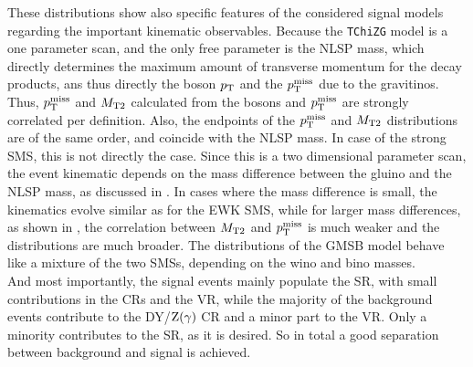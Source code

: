 These distributions show also specific features of the considered signal models regarding the important kinematic observables. Because the \texttt{TChiZG} model is a one parameter scan, and the only free parameter is the NLSP mass, which directly determines the maximum amount of transverse momentum for the decay products, ans thus directly the boson $p_{\mathrm{T}}$ and the $p_{\mathrm{T}}^\text{miss}$ due to the gravitinos. Thus, $p_{\mathrm{T}}^\text{miss}$ and $M_{\mathrm{T2}}$ calculated from the bosons and $p_{\mathrm{T}}^\text{miss}$ are strongly correlated per definition. Also, the endpoints of the $p_{\mathrm{T}}^\text{miss}$ and $M_{\mathrm{T2}}$ distributions are of the same order, and coincide with the NLSP mass. In case of the strong SMS, this is not directly the case. Since this is a two dimensional parameter scan, the event kinematic depends on the mass difference between the gluino and the NLSP mass, as discussed in . In cases where the mass difference is small, the kinematics evolve similar as for the EWK SMS, while for larger mass differences, as shown in , the correlation between $M_{\mathrm{T2}}$ and $p_{\mathrm{T}}^\text{miss}$ is much weaker and the distributions are much broader. The distributions of the GMSB model behave like a mixture of the two SMSs, depending on the wino and bino masses.\\
And most importantly, the signal events mainly populate the SR, with small contributions in the CRs and the VR, while the majority of the background events contribute to the DY/$\mathrm{Z}(\gamma)$ CR and a minor part to the VR. Only a minority contributes to the SR, as it is desired. So in total a good separation between background and signal is achieved.

